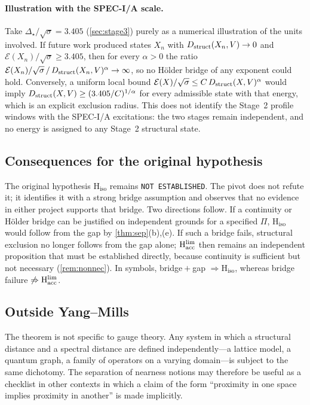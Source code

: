 \documentclass[11pt,a4paper]{article}
\theoremstyle{definition}
\theoremstyle{remark}
\newcommand{\sqs}{\sqrt{\sigma}}
\newcommand{\Hacc}{\mathrm{H}_{\mathrm{acc}}}
\newcommand{\Hiso}{\mathrm{H}_{\mathrm{iso}}}
\begin{document}
\paragraph{Illustration with the SPEC-I/A scale.} Take $\Delta_\star/\sqs=3.405$ (\cref{sec:stage3}) purely as a numerical illustration of the units involved. If future work produced states $X_n$ with $D_{\rm struct}(X_n,V)\to0$ and $\mathcal E(X_n)/\sqs\ge3.405$, then for every $\alpha>0$ the ratio $\mathcal E(X_n)/\sqs\,/\,D_{\rm struct}(X_n,V)^{\alpha}\to\infty$, so no H\"older bridge of any exponent could hold. Conversely, a uniform local bound $\mathcal E(X)/\sqs\le C\,D_{\rm struct}(X,V)^{\alpha}$ would imply $D_{\rm struct}(X,V)\ge(3.405/C)^{1/\alpha}$ for every admissible state with that energy, which is an explicit exclusion radius. This does not identify the Stage~2 profile windows with the SPEC-I/A excitations: the two stages remain independent, and no energy is assigned to any Stage~2 structural state.

\subsection{Consequences for the original hypothesis}\label{ssec:consequences}
The original hypothesis $\Hiso$ remains \texttt{NOT ESTABLISHED}. The pivot does not refute it; it identifies it with a strong bridge assumption and observes that no evidence in either project supports that bridge. Two directions follow. If a continuity or H\"older bridge can be justified on independent grounds for a specified $\Pi$, $\Hiso$ would follow from the gap by \cref{thm:sep}(b),(e). If such a bridge fails, structural exclusion no longer follows from the gap alone; $\Hacc^{\rm lim}$ then remains an independent proposition that must be established directly, because continuity is sufficient but not necessary (\cref{rem:nonnec}). In symbols, bridge${}+{}$gap $\Rightarrow\Hiso$, whereas bridge failure $\not\Rightarrow\Hacc^{\rm lim}$. 

\subsection{Outside Yang--Mills}\label{ssec:outside}
The theorem is not specific to gauge theory. Any system in which a structural distance and a spectral distance are defined independently---a lattice model, a quantum graph, a family of operators on a varying domain---is subject to the same dichotomy. The separation of nearness notions may therefore be useful as a checklist in other contexts in which a claim of the form ``proximity in one space implies proximity in another'' is made implicitly.
\end{document}
